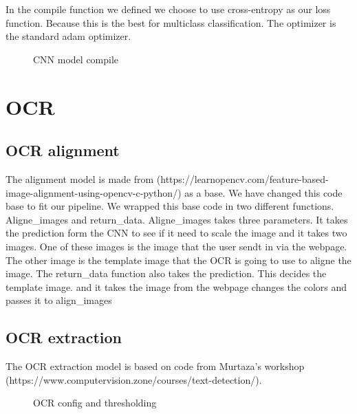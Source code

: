 In the compile function we defined we choose to use cross-entropy as our loss function.
Because this is the best for multiclass classification.
The optimizer is the standard adam optimizer.

\begin{figure}[h]
    \caption{CNN model compile}
    \label{fig:CNN compile}

\end{figure}


\section{OCR}\label{sec:OCR_implementation}

\subsection{OCR alignment}

The alignment model is made from (https://learnopencv.com/feature-based-image-alignment-using-opencv-c-python/) as a base.
We have changed this code base to fit our pipeline.
We wrapped this base code in two different functions.
Aligne\_images and return\_data.
Aligne\_images takes three parameters.
It takes the prediction form the CNN to see if it need to scale the image and it takes two images.
One of these images is the image that the user sendt in via the webpage.
The other image is the template image that the OCR is going to use to aligne the image.
The return\_data function also takes the prediction.
This decides the template image.
and it takes the image from the webpage changes the colors and passes it to align\_images

\subsection{OCR extraction}

The OCR extraction model is based on code from Murtaza's workshop (https://www.computervision.zone/courses/text-detection/).

\begin{figure}[h]
    \caption{OCR config and thresholding}
    \label{fig:OCR config/thresholding}
\end{figure}

